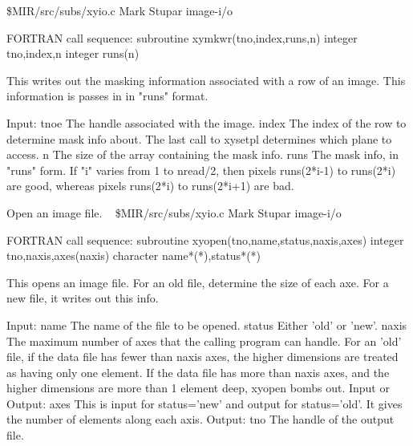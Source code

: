 \newline {} \$MIR/src/subs/xyio.c
\newline {} Mark Stupar
\newline {} image-i/o
\par{\tenpoint
{\eightpoint\begintt
FORTRAN call sequence:
        subroutine xymkwr(tno,index,runs,n)
        integer tno,index,n
        integer runs(n)

  This writes out the masking information associated with a row of an image.
  This information is passes in in "runs" format. 

  Input:
    tnoe        The handle associated with the image.
    index       The index of the row to determine mask info about. The
                last call to xysetpl determines which plane to access.
    n           The size of the array containing the mask info.
    runs        The mask info, in "runs" form. If "i" varies from 1 to
                nread/2, then pixels runs(2*i-1) to runs(2*i) are
                good, whereas pixels runs(2*i) to runs(2*i+1) are bad.  
\endtt}
\par}
%
\noindent Open an image file.
\newline \ 
\newline {} \$MIR/src/subs/xyio.c
\newline {} Mark Stupar
\newline {} image-i/o
\par{\tenpoint
{\eightpoint\begintt
FORTRAN call sequence:
        subroutine xyopen(tno,name,status,naxis,axes)
        integer tno,naxis,axes(naxis)
        character name*(*),status*(*)

  This opens an image file. For an old file, determine the size of
  each axe. For a new file, it writes out this info.

  Input:
    name        The name of the file to be opened.
    status      Either 'old' or 'new'.
    naxis       The maximum number of axes that the calling program can
                handle. For an 'old' file, if the data file has fewer
                than naxis axes, the higher dimensions are treated as having
                only one element. If the data file has more than naxis
                axes, and the higher dimensions are more than 1 element
                deep, xyopen bombs out.
  Input or Output:
    axes        This is input for status='new' and output for status='old'.
                It gives the number of elements along each axis.
  Output:
    tno         The handle of the output file.                          
\endtt}
\par}
